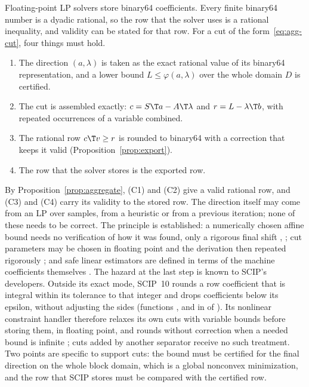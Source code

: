 Floating-point LP solvers store binary64 coefficients. Every finite binary64
number is a dyadic rational, so the row that the solver uses is a rational
inequality, and validity can be stated for that row. For a cut of the
form~\eqref{eq:agg-cut}, four things must hold.
\begin{enumerate}[label=(C\arabic*)]
\item The direction $(a,\lambda)$ is taken as the exact rational value of its
binary64 representation, and a lower bound $L\le\varphi(a,\lambda)$ over the
whole domain $D$ is certified.
\item The cut is assembled exactly: $c=S\T a-A\T\lambda$ and $r=L-\lambda\T b$,
with repeated occurrences of a variable combined.
\item The rational row $c\T v\ge r$ is rounded to binary64 with a correction
that keeps it valid (Proposition~\ref{prop:export}).
\item The row that the solver stores is the exported row.
\end{enumerate}
By Proposition~\ref{prop:aggregate}, (C1) and (C2) give a valid rational row,
and (C3) and (C4) carry its validity to the stored row. The direction itself
may come from an LP over samples, from a heuristic or from a previous
iteration; none of these needs to be correct. The principle is established:
a numerically chosen affine bound needs no verification of how it was found,
only a rigorous final shift \citep[Section~5]{GarloffJanssonSmith2003JCAM},
\citep{GarloffSmith2008}; cut parameters may be chosen in floating point and
the derivation then repeated rigorously
\citep[p.~294]{NeumaierShcherbina2004}; and safe linear estimators are
defined in terms of the machine coefficients themselves
\citep{BorradaileVanHentenryck2005}. The hazard at the last step is known to
SCIP's developers. Outside its exact mode, SCIP~10 rounds a row coefficient
that is integral within its tolerance to that integer and drops coefficients
below its epsilon, without adjusting the sides (functions ,
 and  in  of
\citealp{SCIPsource10}). Its nonlinear constraint handler therefore relaxes its
own cuts with variable bounds before storing them, in floating point, and
rounds without correction when a needed bound is infinite
\citep[Section~4.2.10]{SCIP8report}; cuts added by another separator receive
no such treatment. Two points are specific to support cuts: the bound must be
certified for the final direction on the whole block domain, which is a
global nonconvex minimization, and the row that SCIP stores must be compared
with the certified row.

